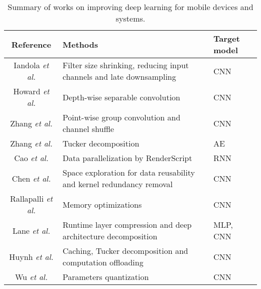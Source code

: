 \documentclass[journal,comsoc,letter]{IEEEtran}
\begin{document}
\begin{table*}[htb]
\centering
\caption{Summary of works on improving deep learning for mobile devices and systems.}
\label{tab:tailormobile}
\begin{tabular}{|c|C{11.5cm}|C{2cm}|}
\hline
\textbf{Reference}                                          & \textbf{Methods}                                                                 & \textbf{Target model} \\ \hline
Iandola \emph{et al.} \cite{iandola2017squeezenet}          & Filter size shrinking, reducing input channels and late downsampling             & CNN                   \\ \hline
Howard \emph{et al.} \cite{howard2017mobilenets}            & Depth-wise separable convolution                                                 & CNN                   \\ \hline
Zhang \emph{et al.} \cite{zhang2017shufflenet}              & Point-wise group convolution and channel shuffle                                 & CNN                   \\ \hline
Zhang \emph{et al.} \cite{zhang2017tucker}                  & Tucker decomposition                                                             & AE                    \\ \hline
Cao \emph{et al.} \cite{cao2017mobirnn}                     & Data parallelization by RenderScript                                             & RNN                   \\ \hline
Chen \emph{et al.} \cite{chen2016deep}                      & Space exploration for data reusability and kernel redundancy removal             & CNN                   \\ \hline
Rallapalli \emph{et al.} \cite{rallapalli2016very}          & Memory optimizations                                                             & CNN                   \\ \hline
Lane \emph{et al.} \cite{lane2016deepx}                     & Runtime layer compression and deep architecture decomposition                    & MLP, CNN              \\ \hline
Huynh \emph{et al.} \cite{huynh2017deepmon}                 & Caching, Tucker decomposition and computation offloading                         & CNN                   \\ \hline
Wu \emph{et al.} \cite{wu2016quantized}                     & Parameters quantization                                                          & CNN                   \\ \hline

\end{tabular}
\end{table*}
\end{document}

